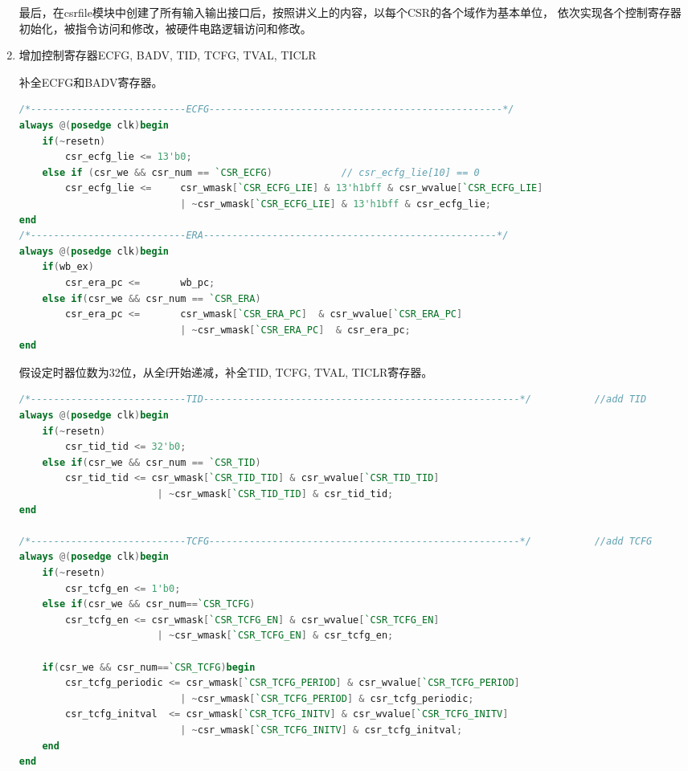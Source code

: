 \documentclass[11pt]{article}
\begin{document}
\begin{enumerate}
最后，在csrfile模块中创建了所有输入输出接口后，按照讲义上的内容，以每个CSR的各个域作为基本单位，
依次实现各个控制寄存器初始化，被指令访问和修改，被硬件电路逻辑访问和修改。

\item 增加控制寄存器ECFG, BADV, TID, TCFG, TVAL, TICLR

补全ECFG和BADV寄存器。
\begin{lstlisting}[language=verilog]
/*---------------------------ECFG---------------------------------------------------*/
always @(posedge clk)begin
    if(~resetn)
        csr_ecfg_lie <= 13'b0;
    else if (csr_we && csr_num == `CSR_ECFG)            // csr_ecfg_lie[10] == 0 
        csr_ecfg_lie <=     csr_wmask[`CSR_ECFG_LIE] & 13'h1bff & csr_wvalue[`CSR_ECFG_LIE]
                            | ~csr_wmask[`CSR_ECFG_LIE] & 13'h1bff & csr_ecfg_lie;
end
/*---------------------------ERA---------------------------------------------------*/
always @(posedge clk)begin
    if(wb_ex)
        csr_era_pc <=       wb_pc;
    else if(csr_we && csr_num == `CSR_ERA)
        csr_era_pc <=       csr_wmask[`CSR_ERA_PC]  & csr_wvalue[`CSR_ERA_PC]
                            | ~csr_wmask[`CSR_ERA_PC]  & csr_era_pc;
end
\end{lstlisting}
假设定时器位数为32位，从全f开始递减，补全TID, TCFG, TVAL, TICLR寄存器。
\begin{lstlisting}[language=verilog]
/*---------------------------TID-------------------------------------------------------*/           //add TID
always @(posedge clk)begin
    if(~resetn)
        csr_tid_tid <= 32'b0;
    else if(csr_we && csr_num == `CSR_TID)
        csr_tid_tid <= csr_wmask[`CSR_TID_TID] & csr_wvalue[`CSR_TID_TID]
                        | ~csr_wmask[`CSR_TID_TID] & csr_tid_tid;
end

/*---------------------------TCFG------------------------------------------------------*/           //add TCFG
always @(posedge clk)begin
    if(~resetn)
        csr_tcfg_en <= 1'b0;
    else if(csr_we && csr_num==`CSR_TCFG)
        csr_tcfg_en <= csr_wmask[`CSR_TCFG_EN] & csr_wvalue[`CSR_TCFG_EN]
                        | ~csr_wmask[`CSR_TCFG_EN] & csr_tcfg_en;
    
    if(csr_we && csr_num==`CSR_TCFG)begin
        csr_tcfg_periodic <= csr_wmask[`CSR_TCFG_PERIOD] & csr_wvalue[`CSR_TCFG_PERIOD]
                            | ~csr_wmask[`CSR_TCFG_PERIOD] & csr_tcfg_periodic;
        csr_tcfg_initval  <= csr_wmask[`CSR_TCFG_INITV] & csr_wvalue[`CSR_TCFG_INITV]
                            | ~csr_wmask[`CSR_TCFG_INITV] & csr_tcfg_initval;
    end
end


\end{lstlisting}
\end{enumerate}
\end{document}
